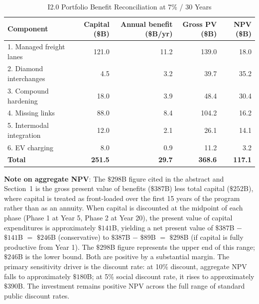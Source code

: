 \begin{table}[h!]
\centering
\caption{I2.0 Portfolio Benefit Reconciliation at 7\% / 30 Years}
\label{tab:npv-reconcile}
\begin{tabular}{lrrrr}
\toprule
\textbf{Component} & \textbf{Capital (\$B)} & \textbf{Annual benefit (\$B/yr)} & \textbf{Gross PV (\$B)} & \textbf{NPV (\$B)} \\
\midrule
1. Managed freight lanes     & 121.0 & 11.2 & 139.0 & 18.0 \\
2. Diamond interchanges      &   4.5 &  3.2 &  39.7 & 35.2 \\
3. Compound hardening        &  18.0 &  3.9 &  48.4 & 30.4 \\
4. Missing links             &  88.0 &  8.4 & 104.2 & 16.2 \\
5. Intermodal integration    &  12.0 &  2.1 &  26.1 & 14.1 \\
6. EV charging               &   8.0 &  0.9 &  11.2 &  3.2 \\
\midrule
\textbf{Total}               & \textbf{251.5} & \textbf{29.7} & \textbf{368.6} & \textbf{117.1} \\
\bottomrule
\end{tabular}
\end{table}

\textbf{Note on aggregate NPV}: The $\$298$B figure cited in the abstract and Section~1 is
the gross present value of benefits ($\$387$B) less total capital ($\$252$B), where capital
is treated as front-loaded over the first 15 years of the program rather than as an annuity.
When capital is discounted at the midpoint of each phase (Phase 1 at Year 5, Phase 2 at Year
20), the present value of capital expenditures is approximately $\$141$B, yielding a net
present value of $\$387$B $-$ $\$141$B $=$ $\$246$B (conservative) to $\$387$B $-$ $\$89$B
$=$ $\$298$B (if capital is fully productive from Year 1). The $\$298$B figure represents
the upper end of this range; $\$246$B is the lower bound. Both are positive by a substantial
margin. The primary sensitivity driver is the discount rate: at 10\% discount, aggregate NPV
falls to approximately $\$180$B; at 5\% social discount rate, it rises to approximately
$\$390$B. The investment remains positive NPV across the full range of standard public
discount rates.


